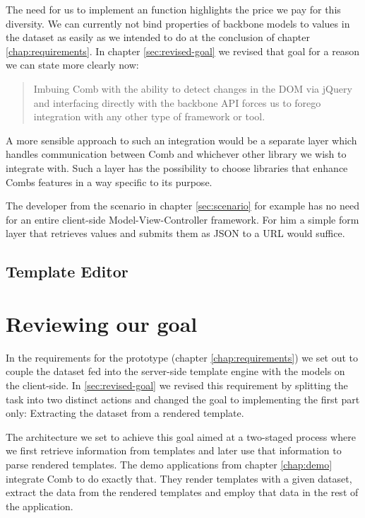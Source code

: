 \documentclass[thesis.tex]{subfiles}
\begin{document}
The need for us to implement an  function highlights the
price we pay for this diversity. We can currently not bind properties of
backbone models to values in the dataset as easily as we intended to do at the
conclusion of chapter \ref{chap:requirements}. In chapter \ref{sec:revised-goal}
we revised that goal for a reason we can state more clearly now:
\begin{quote}
Imbuing Comb with the ability to detect changes in the DOM via jQuery and
interfacing directly with the backbone API forces us to forego integration with
any other type of framework or tool.
\end{quote}
A more sensible approach to such an integration would be a separate layer which
handles communication between Comb and whichever other library we wish to
integrate with. Such a layer has the possibility to choose libraries that
enhance Combs features in a way specific to its purpose.

The developer from the scenario in chapter \ref{sec:scenario} for example has
no need for an entire client-side Model-View-Controller framework.
For him a simple form layer that retrieves values and submits them as JSON to a
URL would suffice.


\subsection{Template Editor}


\section{Reviewing our goal}
In the requirements for the prototype (chapter \ref{chap:requirements})
we set out to couple the dataset fed into the server-side template engine with
the models on the client-side. In \ref{sec:revised-goal} we revised this
requirement by splitting the task into two distinct actions and changed the goal
to implementing the first part only: Extracting the dataset from a rendered
template.

The architecture we set to achieve this goal aimed at a two-staged process where
we first retrieve information from templates and later use that information to
parse rendered templates. The demo applications from chapter \ref{chap:demo}
integrate Comb to do exactly that. They render templates with a given dataset,
extract the data from the rendered templates and employ that data in the rest of
the application.
\end{document}
